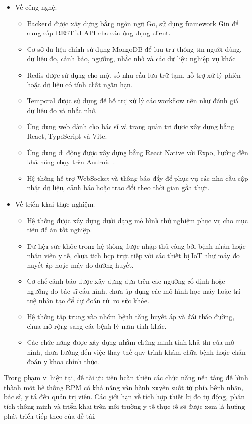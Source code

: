\begin{itemize}
    \item Về công nghệ:
    \begin{itemize}
        \item Backend được xây dựng bằng ngôn ngữ Go, sử dụng framework Gin để cung cấp RESTful API cho các ứng dụng client.
        \item Cơ sở dữ liệu chính sử dụng MongoDB để lưu trữ thông tin người dùng, dữ liệu đo, cảnh báo, ngưỡng, nhắc nhở và các dữ liệu nghiệp vụ khác.
        \item Redis được sử dụng cho một số nhu cầu lưu trữ tạm, hỗ trợ xử lý phiên hoặc dữ liệu có tính chất ngắn hạn.
        \item Temporal được sử dụng để hỗ trợ xử lý các workflow nền như đánh giá dữ liệu đo và nhắc nhở.
        \item Ứng dụng web dành cho bác sĩ và trang quản trị được xây dựng bằng React, TypeScript và Vite.
        \item Ứng dụng di động được xây dựng bằng React Native với Expo, hướng đến khả năng chạy trên  Android .
        \item Hệ thống hỗ trợ WebSocket và thông báo đẩy để phục vụ các nhu cầu cập nhật dữ liệu, cảnh báo hoặc trao đổi theo thời gian gần thực.
    \end{itemize}

    \item Về triển khai thực nghiệm:
    \begin{itemize}
        \item Hệ thống được xây dựng dưới dạng mô hình thử nghiệm phục vụ cho mục tiêu đồ án tốt nghiệp.
        \item Dữ liệu sức khỏe trong hệ thống được nhập thủ công bởi bệnh nhân hoặc nhân viên y tế, chưa tích hợp trực tiếp với các thiết bị IoT như máy đo huyết áp hoặc máy đo đường huyết.
        \item Cơ chế cảnh báo được xây dựng dựa trên các ngưỡng cố định hoặc ngưỡng do bác sĩ cấu hình, chưa áp dụng các mô hình học máy hoặc trí tuệ nhân tạo để dự đoán rủi ro sức khỏe.
        \item Hệ thống tập trung vào nhóm bệnh tăng huyết áp và đái tháo đường, chưa mở rộng sang các bệnh lý mãn tính khác.
        \item Các chức năng được xây dựng nhằm chứng minh tính khả thi của mô hình, chưa hướng đến việc thay thế quy trình khám chữa bệnh hoặc chẩn đoán y khoa chính thức.
    \end{itemize}
\end{itemize}

Trong phạm vi hiện tại, đề tài ưu tiên hoàn thiện các chức năng nền tảng để hình thành một hệ thống RPM có khả năng vận hành xuyên suốt từ phía bệnh nhân, bác sĩ, y tá đến quản trị viên. Các giới hạn về tích hợp thiết bị đo tự động, phân tích thông minh và triển khai trên môi trường y tế thực tế sẽ được xem là hướng phát triển tiếp theo của đề tài.